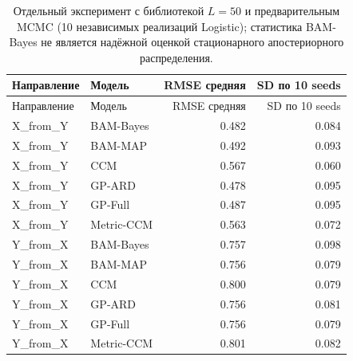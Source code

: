 \begin{longtable}{llrr}
\caption{Отдельный эксперимент с библиотекой $L=50$ и предварительным MCMC (10 независимых реализаций Logistic); статистика BAM-Bayes не является надёжной оценкой стационарного апостериорного распределения.}\label{tab:bayes}\\
\toprule
Направление & Модель & RMSE средняя & SD по 10 seeds \\
\midrule
\endfirsthead
\toprule
Направление & Модель & RMSE средняя & SD по 10 seeds \\
\midrule
\endhead
X\_from\_Y & BAM-Bayes & 0.482 & 0.084 \\
X\_from\_Y & BAM-MAP & 0.492 & 0.093 \\
X\_from\_Y & CCM & 0.567 & 0.060 \\
X\_from\_Y & GP-ARD & 0.478 & 0.095 \\
X\_from\_Y & GP-Full & 0.487 & 0.095 \\
X\_from\_Y & Metric-CCM & 0.563 & 0.072 \\
Y\_from\_X & BAM-Bayes & 0.757 & 0.098 \\
Y\_from\_X & BAM-MAP & 0.756 & 0.079 \\
Y\_from\_X & CCM & 0.800 & 0.079 \\
Y\_from\_X & GP-ARD & 0.756 & 0.081 \\
Y\_from\_X & GP-Full & 0.756 & 0.079 \\
Y\_from\_X & Metric-CCM & 0.801 & 0.082 \\
\bottomrule
\end{longtable}

